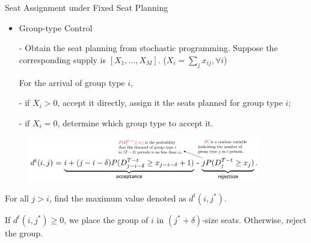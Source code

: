   \begin{frame}{Seat Assignment under Fixed Seat Planning}
    \small
    \begin{itemize}
      \item Group-type Control
      \item[-] Obtain the seat planning from stochastic programming. Suppose the corresponding supply is $[X_1, \ldots, X_M]$. ($X_{i} = \sum_{j} x_{ij}, \forall i$)
      
      For the arrival of group type $i$,

      \item[-] if $X_i > 0$, accept it directly, assign it the seats planned for group type $i$;
      \item[-] if $X_i = 0$, determine which group type to accept it.
    \end{itemize}



    \vspace{-0.5cm}

    \begin{figure}[h]
      \centering
      \includegraphics[width = 0.9\textwidth]{./images/d_ij.png}
    \end{figure}

    \vspace{-0.1cm}

    For all $j > i$, find the maximum value denoted as $d^{t}(i, j^{*})$.
    
    If $d^{t}(i, j^{*}) \geq 0$, we place the group of $i$ in $(j^{*} + \delta)$-size seats. Otherwise, reject the group.

  \end{frame}
  

